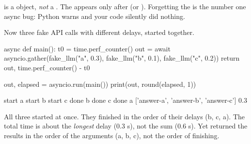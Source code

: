 \begin{typecheck}
 is a  object, \emph{not} a . The
 appears only after  (or ). Forgetting the 
is the number one async bug: Python warns  and your code
silently did nothing.
\end{typecheck}

Now three fake API calls with different delays, started together.

\begin{pycode}
async def main():
    t0 = time.perf_counter()
    out = await asyncio.gather(fake_llm("a", 0.3), fake_llm("b", 0.1),
                               fake_llm("c", 0.2))
    return out, time.perf_counter() - t0

out, elapsed = asyncio.run(main())
print(out, round(elapsed, 1))
\end{pycode}
\begin{rawcode}
start a
start b
start c
done b
done c
done a
['answer-a', 'answer-b', 'answer-c'] 0.3
\end{rawcode}

All three started at once. They finished in the order of their delays (b, c, a). The total time is
about the \emph{longest} delay (0.3 s), not the sum (0.6 s). Yet  returned the
results in the order of the arguments (a, b, c), not the order of finishing.

\begin{center}
\end{center}

